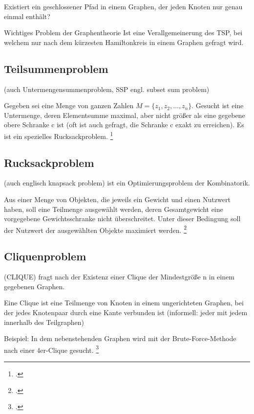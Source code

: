 \documentclass{lehramt-informatik-haupt}
\begin{document}
Existiert ein geschlossener Pfad in einem
Graphen, der jeden Knoten nur genau einmal enthält?

Wichtiges Problem der Graphentheorie
Ist eine Verallgemeinerung des TSP, bei welchem nur nach dem kürzesten
Hamiltonkreis in einem Graphen gefragt wird.

%

\subsection{Teilsummenproblem}

(auch Untermengensummenproblem, SSP engl. subset sum problem)

Gegeben sei eine Menge von ganzen Zahlen $M = \{z_1 , z_2 , \dots, z_n
\}$. Gesucht ist eine Untermenge, deren Elementsumme maximal, aber nicht
größer als eine gegebene obere Schranke c ist (oft ist auch gefragt, die
Schranke c exakt zu erreichen). Es ist ein spezielles Rucksackproblem.
\footcite[Seite 74]{theo:fs:4}

%

\subsection{Rucksackproblem}

(auch englisch knapsack problem) ist ein Optimierungsproblem der
Kombinatorik.

Aus einer Menge von Objekten, die jeweils ein Gewicht und einen Nutzwert
haben, soll eine Teilmenge ausgewählt werden, deren Gesamtgewicht eine
vorgegebene Gewichtsschranke nicht überschreitet. Unter dieser Bedingung
soll der Nutzwert der ausgewählten Objekte maximiert werden.
\footcite[Seite 75]{theo:fs:4}

%

\subsection{Cliquenproblem}

(CLIQUE) fragt nach der Existenz einer Clique der Mindestgröße n in
einem gegebenen Graphen.

Eine Clique ist eine Teilmenge von Knoten in einem ungerichteten
Graphen, bei der jedes Knotenpaar durch eine Kante verbunden ist
(informell: jeder mit jedem innerhalb des Teilgraphen)

Beispiel: In dem nebenstehenden Graphen wird mit der Brute-Force-Methode
nach einer 4er-Clique gesucht.
\footcite[Seite 76]{theo:fs:4}
\end{document}
